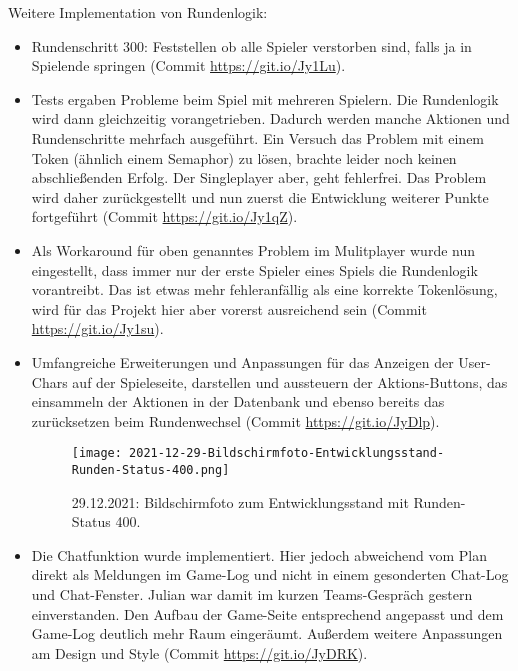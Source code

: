     Weitere Implementation von Rundenlogik:

    \begin{itemize}
        \item Rundenschritt 300: Feststellen ob alle Spieler verstorben sind, falls ja in Spielende springen (Commit \url{https://git.io/Jy1Lu}).
        \item Tests ergaben Probleme beim Spiel mit mehreren Spielern. Die Rundenlogik wird dann gleichzeitig vorangetrieben. Dadurch werden manche Aktionen und Rundenschritte mehrfach ausgeführt. Ein Versuch das Problem mit einem Token (ähnlich einem Semaphor) zu lösen, brachte leider noch keinen abschließenden Erfolg. Der Singleplayer aber, geht fehlerfrei. Das Problem wird daher zurückgestellt und nun zuerst die Entwicklung weiterer Punkte fortgeführt (Commit \url{https://git.io/Jy1qZ}).
        \item Als Workaround für oben genanntes Problem im Mulitplayer wurde nun eingestellt, dass immer nur der erste Spieler eines Spiels die Rundenlogik vorantreibt. Das ist etwas mehr fehleranfällig als eine korrekte Tokenlösung, wird für das Projekt hier aber vorerst ausreichend sein (Commit \url{https://git.io/Jy1su}).
        \item Umfangreiche Erweiterungen und Anpassungen für das Anzeigen der User-Chars auf der Spieleseite, darstellen und aussteuern der Aktions-Buttons, das einsammeln der Aktionen in der Datenbank und ebenso bereits das zurücksetzen beim Rundenwechsel (Commit \url{https://git.io/JyDlp}).
    
        \begin{figure}[H]
            \centering
            \caption{29.12.2021: Bildschirmfoto zum Entwicklungsstand mit Runden-Status 400.}
            \label{fig:2021-12-29-Bildschirmfoto-Entwicklungsstand-Runden-Status-400.png}
            \texttt{[image: 2021-12-29-Bildschirmfoto-Entwicklungsstand-Runden-Status-400.png]}
        \end{figure}
    
        \item Die Chatfunktion wurde implementiert. Hier jedoch abweichend vom Plan direkt als Meldungen im Game-Log und nicht in einem gesonderten Chat-Log und Chat-Fenster. Julian war damit im kurzen Teams-Gespräch gestern einverstanden. Den Aufbau der Game-Seite entsprechend angepasst und dem Game-Log deutlich mehr Raum eingeräumt. Außerdem weitere Anpassungen am Design und Style (Commit \url{https://git.io/JyDRK}).
    
    \end{itemize}
    





